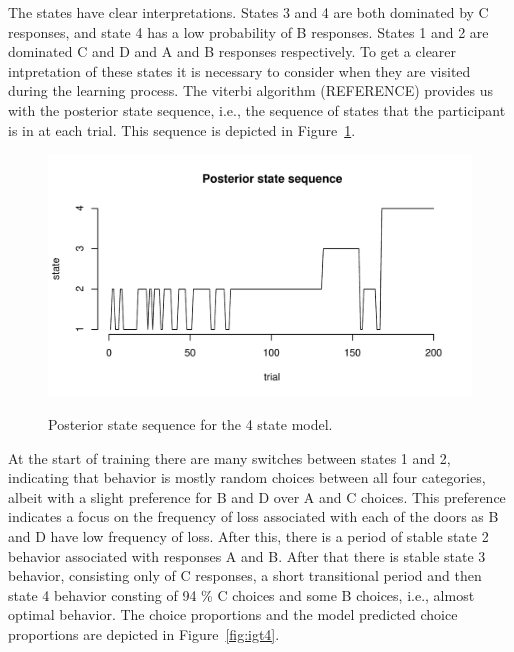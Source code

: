 \documentclass[a4paper,12pt,man,english]{apa} %
\begin{document}
The states have clear interpretations. States 3 and 4 are both
dominated by C responses, and state 4 has a low probability of B
responses. States 1 and 2 are dominated C and D and A and B responses 
respectively. To get a clearer intpretation of these states it is
necessary to consider when they are visited during the learning
process. The viterbi algorithm (REFERENCE) provides us with the
posterior state sequence, i.e., the sequence of states that the
participant is in at each trial. This sequence is depicted in
Figure~\ref{fig:post4}. 

\begin{figure}
\begin{center}
	\includegraphics[width=\textwidth]{graphs/post4.pdf}
	\label{fig:post4}
	\caption{Posterior state sequence for the 4 state model.}
\end{center}
\end{figure}

At the start of training there are many switches between states 1 and 
2, indicating that behavior is mostly random choices between all four 
categories, albeit with a slight preference for B and D over A and C
choices. This preference indicates a focus on the frequency of loss
associated with each of the doors as B and D have low frequency of
loss. After this, there is a period of stable state 2 behavior
associated with responses A and B. After that there is stable state 3 
behavior, consisting only of C responses, a short transitional period 
and then state 4 behavior consting of 94 \% C choices and some B
choices, i.e., almost optimal behavior. The choice proportions and the
model predicted choice proportions are depicted in
Figure~\ref{fig:igt4}. 
\end{document}
